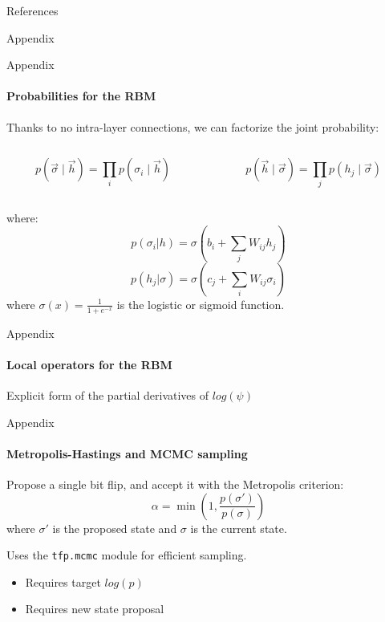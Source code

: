 \documentclass{beamer}
\begin{document}
\begin{frame}{References}

\end{frame}

\backmatter

\appendix


\begin{chapter}{}{Appendix}
\end{chapter}

\begin{frame}{Appendix}
\framesubtitle{Probabilities for the RBM}

Thanks to no intra-layer connections, we can factorize the joint probability:

\begin{columns}[t]
	\begin{column}{0.48\textwidth}
		$$ p(\vec{\sigma} \mid \vec{h}) = \prod_{i} p(\sigma_i \mid \vec{h}) $$
	\end{column}
	\begin{column}{0.48\textwidth}
		$$ p(\vec{h} \mid \vec{\sigma}) = \prod_{j} p(h_j \mid \vec{\sigma}) $$
	\end{column}
\end{columns}
where:
$$ p(\sigma_i | h) = \sigma\left(b_i + \sum_{j} W_{ij} h_j\right) $$
$$ p(h_j | \sigma) = \sigma\left(c_j + \sum_{i} W_{ij} \sigma_i\right) $$
where $\sigma(x) = \frac{1}{1 + e^{-x}}$ is the logistic or sigmoid function.

\end{frame}

\begin{frame}{Appendix}
\framesubtitle{Local operators for the RBM}
Explicit form of the partial derivatives of $log\left(\psi\right)$


\end{frame}

\begin{frame}[fragile]{Appendix}
\framesubtitle{Metropolis-Hastings and MCMC sampling}
Propose a single bit flip, and accept it with the Metropolis criterion:
$$\alpha = \min\left(1, \frac{p(\sigma')}{p(\sigma)}\right)$$
where $\sigma'$ is the proposed state and $\sigma$ is the current state.
\baselineskip

Uses the \lstinline[style=kaolstplain]|tfp.mcmc| module for efficient sampling.
\begin{itemize}
	\item Requires target $log(p)$
	\item Requires new state proposal
\end{itemize}

\end{frame}
\end{document}
